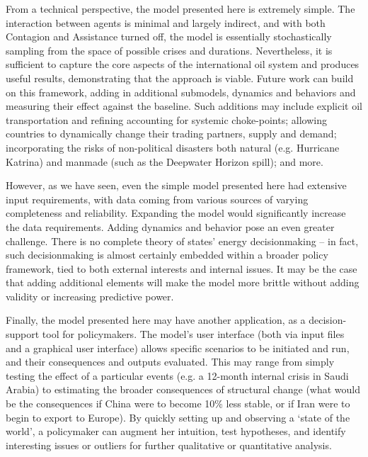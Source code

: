 \documentclass{llncs}
\begin{document}
From a technical perspective, the model presented here is extremely simple. The interaction between agents is minimal and largely indirect, and with both Contagion and Assistance turned off, the model is essentially stochastically sampling from the space of possible crises and durations. Nevertheless, it is sufficient to capture the core aspects of the international oil system and produces useful results, demonstrating that the approach is viable. Future work can build on this framework, adding in additional submodels, dynamics and behaviors and measuring their effect against the baseline. Such additions may include explicit oil transportation and refining accounting for systemic choke-points; allowing countries to dynamically change their trading partners, supply and demand; incorporating the risks of non-political disasters both natural (e.g. Hurricane Katrina) and manmade (such as the Deepwater Horizon spill); and more.

However, as we have seen, even the simple model presented here had extensive input requirements, with data coming from various sources of varying completeness and reliability. Expanding the model would significantly increase the data requirements. Adding dynamics and behavior pose an even greater challenge. There is no complete theory of states' energy decisionmaking -- in fact, such decisionmaking is almost certainly embedded within a broader policy framework, tied to both external interests and internal issues. It may be the case that adding additional elements will make the model more brittle without adding validity or increasing predictive power.

Finally, the model presented here may have another application, as a decision-support tool for policymakers. The model's user interface (both via input files and a graphical user interface) allows specific scenarios to be initiated and run, and their consequences and outputs evaluated. This may range from simply testing the effect of a particular events (e.g. a 12-month internal crisis in Saudi Arabia) to estimating the broader consequences of structural change (what would be the consequences if China were to become 10\% less stable, or if Iran were to begin to export to Europe). By quickly setting up and observing a `state of the world', a policymaker can augment her intuition, test hypotheses, and identify interesting issues or outliers for further qualitative or quantitative analysis. 



\end{document}
